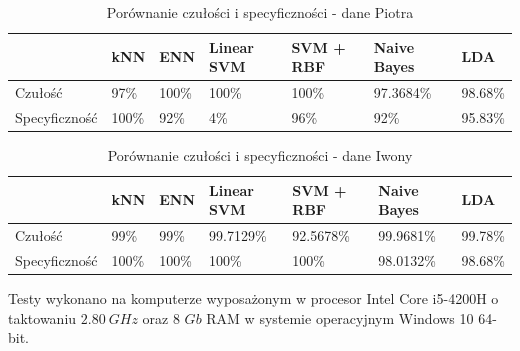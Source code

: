 \documentclass[[10pt,a4paper]{article}
\begin{document}
\begin{table}[h]
\centering
\caption{Porównanie czułości i specyficzności - dane Piotra}
\label{sens1}
\begin{tabular}{|l|l|l|l|l|l|}
\hline
              & kNN & ENN & Linear SVM & SVM + RBF & Naive Bayes & LDA \\ \hline
Czułość       &  97\%  & 100\%  &    100\%    &    100\%   &      97.3684\%    & 98.68\%  \\ \hline
Specyficzność &   100\%   &  92\%   &     4\%       &     96\%   &       92\%     & 95.83\% \\ \hline
\end{tabular}
\end{table}


\begin{table}[h]
\centering
\caption{Porównanie czułości i specyficzności - dane Iwony}
\label{sens2}
\begin{tabular}{|l|l|l|l|l|l|}
\hline
              & kNN & ENN & Linear SVM & SVM + RBF & Naive Bayes & LDA \\ \hline
Czułość       &  99\%   &  99\%   &    99.7129\%        &     92.5678\%       &   99.9681\%    & 99.78\%      \\ \hline
Specyficzność &  100\%   &  100\%   &     100\%       &      100\%     &   98.0132\%    &98.68\%      \\ \hline
\end{tabular}
\end{table}



Testy wykonano na komputerze wyposażonym w procesor Intel Core i5-4200H o taktowaniu $2.80 \: GHz$ oraz 8 $Gb$ RAM w systemie operacyjnym Windows 10 64-bit.
\end{document}
